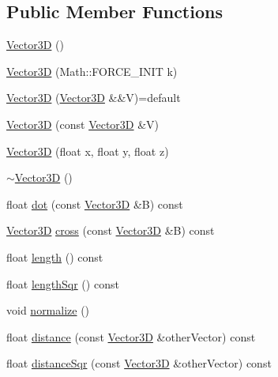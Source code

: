 \subsection*{Public Member Functions}
\begin{DoxyCompactItemize}
\item 
\hyperlink{classdrider_s_d_k_1_1_vector3_d_a13d08e7ca2aea2687fc886140fd3e7cb}{Vector3D} ()
\item 
\hyperlink{classdrider_s_d_k_1_1_vector3_d_a69599690e85407589a6ac4f6dbe7454e}{Vector3D} (Math\+::\+F\+O\+R\+C\+E\+\_\+\+I\+N\+IT k)
\item 
\hyperlink{classdrider_s_d_k_1_1_vector3_d_a13783843ebb3807bbe1731e57bef3c1f}{Vector3D} (\hyperlink{classdrider_s_d_k_1_1_vector3_d}{Vector3D} \&\&V)=default
\item 
\hyperlink{classdrider_s_d_k_1_1_vector3_d_a6706fd9097922c155576146de3f51a67}{Vector3D} (const \hyperlink{classdrider_s_d_k_1_1_vector3_d}{Vector3D} \&V)
\item 
\hyperlink{classdrider_s_d_k_1_1_vector3_d_a7811eca35e237f48972788b59ea9b07e}{Vector3D} (float x, float y, float z)
\item 
\hyperlink{classdrider_s_d_k_1_1_vector3_d_af34c4e39b0fea97468aa1012bc842a8d}{$\sim$\+Vector3D} ()
\item 
float \hyperlink{classdrider_s_d_k_1_1_vector3_d_ac49c5b28ee95fbe6d7fae02f00008b6d}{dot} (const \hyperlink{classdrider_s_d_k_1_1_vector3_d}{Vector3D} \&B) const
\item 
\hyperlink{classdrider_s_d_k_1_1_vector3_d}{Vector3D} \hyperlink{classdrider_s_d_k_1_1_vector3_d_ae2338b1fbca5b81112571c81418eac5e}{cross} (const \hyperlink{classdrider_s_d_k_1_1_vector3_d}{Vector3D} \&B) const
\item 
float \hyperlink{classdrider_s_d_k_1_1_vector3_d_aa922725a227a655e4245a67b40840bb6}{length} () const
\item 
float \hyperlink{classdrider_s_d_k_1_1_vector3_d_a95efa15ddb5b55ab4278dc45e1da88e1}{length\+Sqr} () const
\item 
void \hyperlink{classdrider_s_d_k_1_1_vector3_d_afcec7f0ed8e1b080c1cdaf3d0cedac5c}{normalize} ()
\item 
float \hyperlink{classdrider_s_d_k_1_1_vector3_d_a77420a5cccfd611d38365dc9b19a7364}{distance} (const \hyperlink{classdrider_s_d_k_1_1_vector3_d}{Vector3D} \&other\+Vector) const
\item 
float \hyperlink{classdrider_s_d_k_1_1_vector3_d_a861d1e31856dabdc229c26b6fbab60a8}{distance\+Sqr} (const \hyperlink{classdrider_s_d_k_1_1_vector3_d}{Vector3D} \&other\+Vector) const

\end{DoxyCompactItemize}
